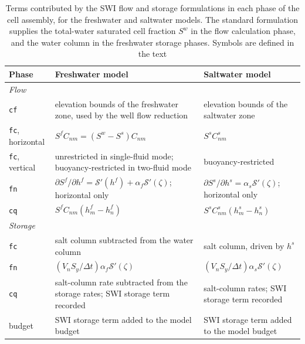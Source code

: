 \begin{table}[!ht]
	\caption[Terms contributed by the SWI formulation in each assembly phase]{Terms contributed by the SWI flow and storage formulations in each phase of the \mf cell assembly, for the freshwater and saltwater models. The standard formulation supplies the total-water saturated cell fraction $S^{w}$ in the flow calculation phase, and the water column in the freshwater storage phases. Symbols are defined in the text}
	\label{tab:swi-phases}
	\small
	\centering
	\begin{tabular}{l >{\raggedright\arraybackslash}p{} >{\raggedright\arraybackslash}p{}}
		\hline
		\hline
		Phase & Freshwater model & Saltwater model \\
		\hline
		\multicolumn{3}{l}{\textit{Flow}} \\
		\texttt{cf} & elevation bounds of the freshwater zone, used by the well flow reduction & elevation bounds of the saltwater zone \\
		\texttt{fc}, horizontal & $S^{f}C_{nm}=\left(S^{w}-S^{s}\right)C_{nm}$ & $S^{s}C^{s}_{nm}$ \\
		\texttt{fc}, vertical & unrestricted in single-fluid mode; buoyancy-restricted in two-fluid mode & buoyancy-restricted \\
		\texttt{fn} & $\partial S^{f}/\partial h^{f}=\mathcal{S}'(h^{f})+\alpha_{f}\mathcal{S}'(\zeta)$; horizontal only & $\partial S^{s}/\partial h^{s}=\alpha_{s}\mathcal{S}'(\zeta)$; horizontal only \\
		\texttt{cq} & $S^{f}C_{nm}\left(h^{f}_{m}-h^{f}_{n}\right)$ & $S^{s}C^{s}_{nm}\left(h^{s}_{m}-h^{s}_{n}\right)$ \\
		\hline
		\multicolumn{3}{l}{\textit{Storage}} \\
		\texttt{fc} & salt column subtracted from the water column & salt column, driven by $h^{s}$ \\
		\texttt{fn} & $\left(V_{n}S_{y}/\Delta t\right)\alpha_{f}\mathcal{S}'(\zeta)$ & $\left(V_{n}S_{y}/\Delta t\right)\alpha_{s}\mathcal{S}'(\zeta)$ \\
		\texttt{cq} & salt-column rate subtracted from the storage rates; SWI storage term recorded & salt-column rates; SWI storage term recorded \\
		budget & SWI storage term added to the model budget & SWI storage term added to the model budget \\
		\hline
		\hline
	\end{tabular}
\end{table}

